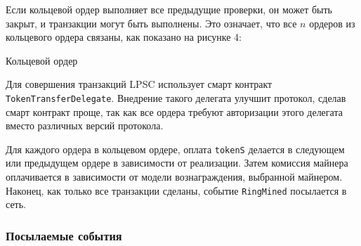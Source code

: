 \documentclass[utf8,nofonts]{article}
\makeatletter
\newenvironment{figurehere}
 {\def\@captype{figure}}
 {}
\makeatother
\begin{document}
\begin{multicols}{2}
	Если кольцевой ордер выполняет все предыдущие проверки, он может быть закрыт, и транзакции могут быть выполнены. Это означает, что все $ n $ ордеров из кольцевого ордера связаны, как показано на рисунке 4:
	
	\begin{center}
		\begin{figurehere}
			\centering
			\caption{Кольцевой ордер}
			\label{fig:settlement}
		\end{figurehere}
	\end{center}
	
	Для совершения транзакций LPSC использует смарт контракт \verb|TokenTransferDelegate|. Внедрение такого делегата улучшит протокол, сделав смарт контракт проще, так как все ордера требуют авторизации этого делегата вместо различных версий протокола.
	
	Для каждого ордера в кольцевом ордере, оплата \verb|tokenS| делается в следующем или предыдущем ордере в зависимости от реализации. Затем комиссия майнера оплачивается в зависимости от модели вознаграждения, выбранной майнером. Наконец, как только все транзакции сделаны, событие \verb|RingMined| посылается в сеть.
	
	\subsubsection{Посылаемые события\label{sec:events}}
	

\end{multicols}
\end{document}

